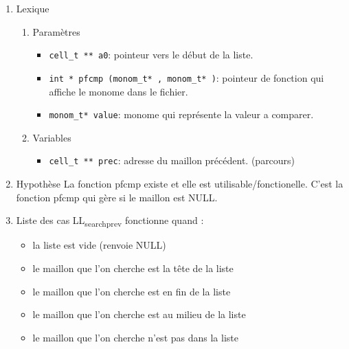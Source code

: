 \documentclass[11pt]{article}
\begin{document}
\begin{enumerate}
\item Lexique
\label{sec:org56e64ef}
\begin{enumerate}
\item Paramètres
\label{sec:org3b9518b}
\begin{itemize}
\item \texttt{cell\_t ** a0}: pointeur vers le début de la liste.
\item \texttt{int * pfcmp (monom\_t* , monom\_t* )}: pointeur de fonction qui affiche le monome dans le fichier.
\item \texttt{monom\_t* value}: monome qui représente la valeur a comparer.
\end{itemize}
\item Variables
\label{sec:org8ed90f8}
\begin{itemize}
\item \texttt{cell\_t ** prec}: adresse du maillon précédent. (parcours)
\end{itemize}
\end{enumerate}

\item Hypothèse
\label{sec:org7484fad}
La fonction pfcmp existe et elle est utilisable/fonctionelle.
C'est la fonction pfcmp qui gère si le maillon est NULL.

\item Liste des cas
\label{sec:orga034bc8}
LL\textsubscript{search}\textsubscript{prev} fonctionne quand :
\begin{itemize}
\item la liste est vide (renvoie NULL)
\item le maillon que l'on cherche est la tête de la liste
\item le maillon que l'on cherche est en fin de la liste
\item le maillon que l'on cherche est au milieu de la liste
\item le maillon que l'on cherche n'est pas dans la liste
\end{itemize}
\end{enumerate}
\end{document}
